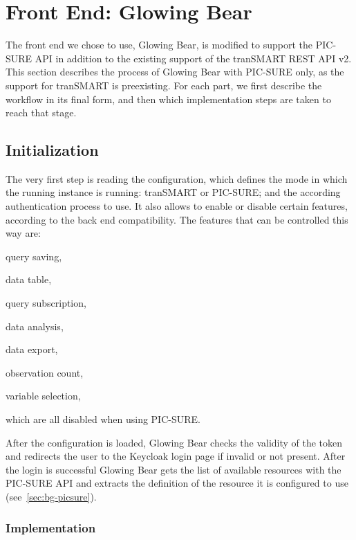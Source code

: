
\section{Front End: Glowing Bear}
\label{sec:interoplayer-gb}

The front end we chose to use, Glowing Bear, is modified to support the PIC-SURE API in addition to the existing support of the tranSMART REST API v2.
This section describes the process of Glowing Bear with PIC-SURE only, as the support for tranSMART is preexisting.
For each part, we first describe the workflow in its final form, and then which implementation steps are taken to reach that stage.

\subsection{Initialization}

The very first step is reading the configuration, which defines the mode in which the running instance is running: tranSMART or PIC-SURE; and the according authentication process to use.
It also allows to enable or disable certain features, according to the back end compatibility.
The features that can be controlled this way are:
\begin{enumerate*}
    \item query saving,
    \item data table,
    \item query subscription,
    \item data analysis,
    \item data export,
    \item observation count,
    \item variable selection,
\end{enumerate*}
which are all disabled when using PIC-SURE.

After the configuration is loaded, Glowing Bear checks the validity of the token and redirects the user to the Keycloak login page if invalid or not present.
After the login is successful Glowing Bear gets the list of available resources with the PIC-SURE API and extracts the definition of the resource it is configured to use (see~\ref{sec:bg-picsure}).


\subsubsection*{Implementation}

